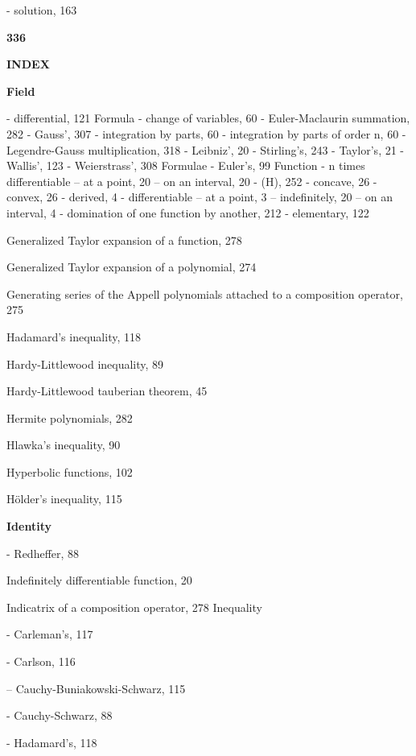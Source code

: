 - solution, 163

\par\noindent\textbf{336}\par

\par\noindent\textbf{INDEX}\par

\par\noindent\textbf{Field}\par

- differential, 121 Formula - change of variables, 60 - Euler-Maclaurin summation, 282 - Gauss', 307 - integration by parts, 60 - integration by parts of order n, 60 - Legendre-Gauss multiplication, 318 - Leibniz', 20 - Stirling's, 243 - Taylor's, 21 - Wallis', 123 - Weierstrass', 308 Formulae - Euler's, 99 Function - n times differentiable -- at a point, 20 -- on an interval, 20 - (H), 252 - concave, 26 - convex, 26 - derived, 4 - differentiable -- at a point, 3 -- indefinitely, 20 -- on an interval, 4 - domination of one function by another, 212 - elementary, 122

Generalized Taylor expansion of a function, 278

Generalized Taylor expansion of a polynomial, 274

Generating series of the Appell polynomials attached to a composition operator, 275

Hadamard's inequality, 118

Hardy-Littlewood inequality, 89

Hardy-Littlewood tauberian theorem, 45

Hermite polynomials, 282

Hlawka's inequality, 90

Hyperbolic functions, 102

Hölder's inequality, 115

\par\noindent\textbf{Identity}\par

- Redheffer, 88

Indefinitely differentiable function, 20

Indicatrix of a composition operator, 278 Inequality

- Carleman's, 117

- Carlson, 116

-- Cauchy-Buniakowski-Schwarz, 115

- Cauchy-Schwarz, 88

- Hadamard's, 118

